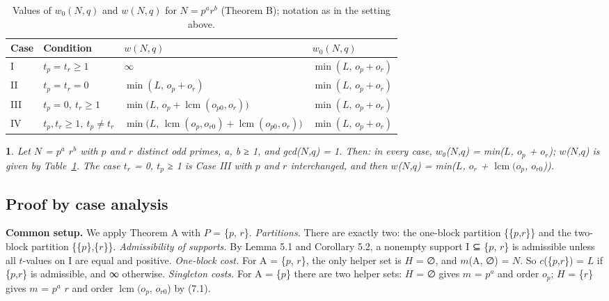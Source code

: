 \documentclass[pdflatex,sn-mathphys-num]{sn-jnl}
\theoremstyle{thmstyleone}
\newcommand{\thmxname}{}
\newtheorem*{thmxinner}{\thmxname}
\newenvironment{thmx}[1]{\renewcommand{\thmxname}{#1}\begin{thmxinner}}{\end{thmxinner}}
\theoremstyle{thmstylethree}
\begin{document}
\begin{table}[ht]
\caption{Values of $w_0(N,q)$ and $w(N,q)$ for $N=p^ar^b$ (Theorem B); notation as in the setting above.}\label{tabB}
\centering\small
\begin{tabular}{@{}llll@{}}
\toprule
Case & Condition & $w(N,q)$ & $w_0(N,q)$\\
\midrule
I & $t_p=t_r\ge 1$ & $\infty$ & $\min(L,\,o_p+o_r)$\\
II & $t_p=t_r=0$ & $\min(L,\,o_p+o_r)$ & $\min(L,\,o_p+o_r)$\\
III & $t_p=0,\ t_r\ge 1$ & $\min\bigl(L,\,o_p+\operatorname{lcm}(o_{p0},o_r)\bigr)$ & $\min(L,\,o_p+o_r)$\\
IV & $t_p,t_r\ge 1,\ t_p\ne t_r$ & $\min\bigl(L,\,\operatorname{lcm}(o_p,o_{r0})+\operatorname{lcm}(o_{p0},o_r)\bigr)$ & $\min(L,\,o_p+o_r)$\\
\bottomrule
\end{tabular}
\end{table}

\begin{thmx}{Theorem B}

Let \(N\) = \(p^a\) \(r^b\) with \(p\) and \(r\) distinct odd primes, a, b ≥ 1, and gcd(\(N\),\(q\)) = 1. Then: in every case, \(w\)₀(\(N\),\(q\)) = min(\(L\), \(o_p\) + \(o_r\)); \(w\)(\(N\),\(q\)) is given by Table~\ref{tabB}. The case \(t_r\) = 0, \(t_p\) ≥ 1 is Case III with \(p\) and \(r\) interchanged, and then \(w\)(\(N\),\(q\)) = min(\(L\), \(o_r\) + \(\operatorname{lcm}(o_p\), \(o_{r0}\))).

\end{thmx}

\subsection{Proof by case analysis}

\textbf{Common setup.} We apply Theorem A with \(P\) = \{\(p\), \(r\)\}. \emph{Partitions.} There are exactly two: the one-block partition \{\{\(p\),\(r\)\}\} and the two-block partition \{\{\(p\)\},\{\(r\)\}\}. \emph{Admissibility of supports.} By Lemma 5.1 and Corollary 5.2, a nonempty support I ⊆ \{\(p\), \(r\)\} is admissible unless all \(t\)-values on I are equal and positive. \emph{One-block cost.} For A = \{\(p\), \(r\)\}, the only helper set is \(H\) = ∅, and \(m\)(A, ∅) = \(N\). So \(c\)(\{\(p\),\(r\)\}) = \(L\) if \{\(p\),\(r\)\} is admissible, and ∞ otherwise. \emph{Singleton costs.} For A = \{\(p\)\} there are two helper sets: \(H\) = ∅ gives \(m\) = \(p^a\) and order \(o_p\); \(H\) = \{\(r\)\} gives \(m\) = \(p^a\) \(r\) and order \(\operatorname{lcm}(o_p\), \(o_{r0}\)) by (7.1).
\end{document}
